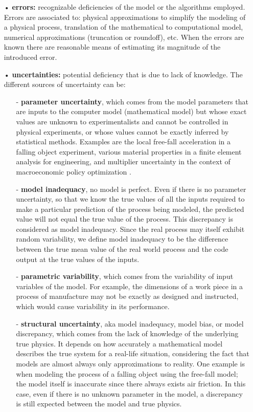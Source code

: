 \begin{itemize}
\item[•] \textbf{errors:} recognizable deficiencies of the model or the algorithms employed. Errors are associated to: physical approximations to simplify the modeling of a physical process, translation of the mathematical to computational model, numerical approximations (truncation or roundoff), etc. When the errors are known there are reasonable means of estimating its magnitude of the introduced error. 
\item[•] \textbf{uncertainties:} potential deficiency that is due to lack of knowledge. The different sources of uncertainty can be:
\begin{itemize}
\item[-] \textbf{parameter uncertainty}, which comes from the model parameters that are inputs to the computer model (mathematical model) but whose exact values are unknown to experimentalists and cannot be controlled in physical experiments, or whose values cannot be exactly inferred by statistical methods. Examples are the local free-fall acceleration in a falling object experiment, various material properties in a finite element analysis for engineering, and multiplier uncertainty in the context of macroeconomic policy optimization \cite{Kennedy2001}.
\item[-] \textbf{model inadequacy}, no model is perfect. Even if there is no parameter uncertainty, so that we know the true values of all the inputs required to make a particular prediction of the process being modeled, the predicted value will not equal the true value of the process. This discrepancy is considered as model inadequacy. Since the real process may itself exhibit random variability, we define model inadequacy to be the difference between the true mean value of the real world process and the code output at the true values of the inputs.
\item[-] \textbf{parametric variability}, which comes from the variability of input variables of the model. For example, the dimensions of a work piece in a process of manufacture may not be exactly as designed and instructed, which would cause variability in its performance. 
\item[-] \textbf{structural uncertainty}, aka model inadequacy, model bias, or model discrepancy, which comes from the lack of knowledge of the underlying true physics. It depends on how accurately a mathematical model describes the true system for a real-life situation, considering the fact that models are almost always only approximations to reality. One example is when modeling the process of a falling object using the free-fall model; the model itself is inaccurate since there always exists air friction. In this case, even if there is no unknown parameter in the model, a discrepancy is still expected between the model and true physics. 

\end{itemize}
\end{itemize}
